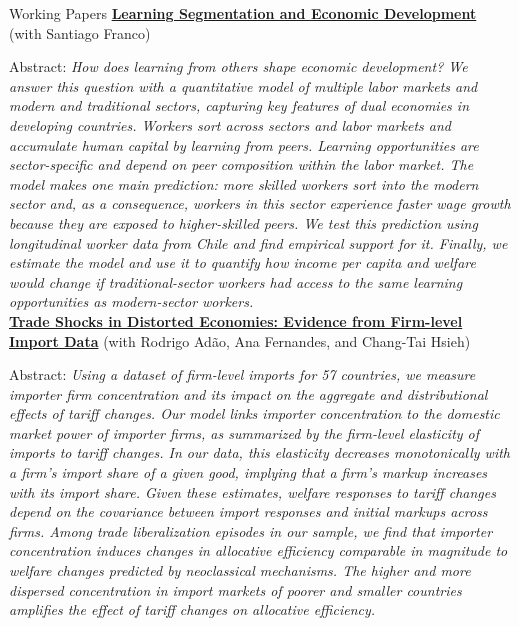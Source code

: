 \documentclass{resume} %
\begin{document}
		\begin{rSection}{Working Papers}
			\href{https://francotabares.github.io/JMpacket/Franco_Quintero_Informal_Growth.pdf}{\textbf{Learning Segmentation and Economic Development}} (with Santiago Franco)

			Abstract: \textit{How does learning from others shape economic development? We answer this question with a quantitative model of multiple labor markets and modern and traditional sectors, capturing key features of dual economies in developing countries. Workers sort across sectors and labor markets and accumulate human capital by learning from peers. Learning opportunities are sector-specific and depend on peer composition within the labor market. The model makes one main prediction: more skilled workers sort into the modern sector and, as a consequence, workers in this sector experience faster wage growth because they are exposed to higher-skilled peers. We test this prediction using longitudinal worker data from Chile and find empirical support for it. Finally, we estimate the model and use it to quantify how income per capita and welfare would change if traditional-sector workers had access to the same learning opportunities as modern-sector workers.}\\

			\href{https://jmquintero.com/files/pdf/drafts/AAHQ_draft_Jun2025.pdf}{\textbf{Trade Shocks in Distorted Economies: Evidence from Firm-level Import Data}} (with Rodrigo Adão, Ana Fernandes, and Chang-Tai Hsieh)

			Abstract: \textit{Using a dataset of firm-level imports for 57 countries, we measure importer firm concentration and its impact on the aggregate and distributional effects of tariff changes. Our model links importer concentration to the domestic market power of importer firms, as summarized by the firm-level elasticity of imports to tariff changes. In our data, this elasticity decreases monotonically with a firm's import share of a given good, implying that a firm's markup increases with its import share. Given these estimates, welfare responses to tariff changes depend on the covariance between import responses and initial markups across firms. Among trade liberalization episodes in our sample, we find that importer concentration induces changes in allocative efficiency comparable in magnitude to welfare changes predicted by neoclassical mechanisms. The higher and more dispersed concentration in import markets of poorer and smaller countries amplifies the effect of tariff changes on allocative efficiency.}
		\end{rSection}
\end{document}
